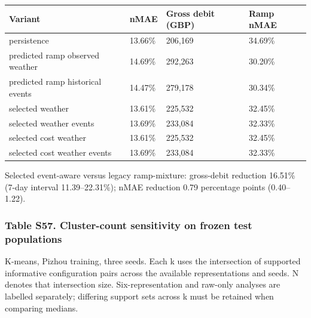 \documentclass[a4paper,11pt]{article}
\newcounter{none}
\begin{document}
{\def\LTcaptype{none} %
\begin{longtable}[]{@{}llll@{}}
\toprule\noalign{}
Variant & nMAE & Gross debit (GBP) & Ramp nMAE \\
\midrule\noalign{}
\endhead
\bottomrule\noalign{}
\endlastfoot
persistence & 13.66\% & 206,169 & 34.69\% \\
predicted ramp observed weather & 14.69\% & 292,263 & 30.20\% \\
predicted ramp historical events & 14.47\% & 279,178 & 30.34\% \\
selected weather & 13.61\% & 225,532 & 32.45\% \\
selected weather events & 13.69\% & 233,084 & 32.33\% \\
selected cost weather & 13.61\% & 225,532 & 32.45\% \\
selected cost weather events & 13.69\% & 233,084 & 32.33\% \\
\end{longtable}
}

Selected event-aware versus legacy ramp-mixture: gross-debit reduction 16.51\% (7-day interval 11.39--22.31\%); nMAE reduction 0.79 percentage points (0.40--1.22).

\subsubsection{Table S57. Cluster-count sensitivity on frozen test populations}\label{table-s57.-cluster-count-sensitivity-on-frozen-test-populations}

K-means, Pizhou training, three seeds. Each k uses the intersection of supported informative configuration pairs across the available representations and seeds. N denotes that intersection size. Six-representation and raw-only analyses are labelled separately; differing support sets across k must be retained when comparing medians.
\end{document}
